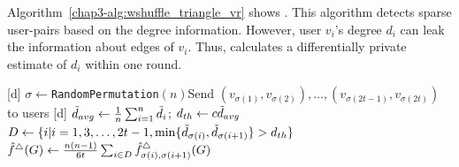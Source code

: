 Algorithm~\ref{chap3-alg:wshuffle_triangle_vr} shows \AlgWSTriVR{}.
This algorithm detects sparse user-pairs based on the degree information.
However, user $v_i$'s degree $d_i$ can leak the information about edges of $v_i$.
Thus, \AlgWSTriVR{} calculates a differentially private estimate of $d_i$ within one round.

\setlength{\algomargin}{5mm}
\begin{algorithm}[t]
  \SetAlgoLined
  [d] $\sigma \leftarrow$\texttt{RandomPermutation}$(n)$\;
  [d] Send $(v_{\sigma(1)}, v_{\sigma(2)}), \ldots, (v_{\sigma(2t-1)}, v_{\sigma(2t)})$ to users\;
  [d] $\tilde{d}_{avg} \leftarrow \frac{1}{n} \sum_{i=1}^n \tilde{d}_i$; $d_{th} \leftarrow c \tilde{d}_{avg}$\;
  [d] $D \leftarrow \{i | i = 1, 3, \ldots, 2t-1,
  \min\{\tilde{d}_{\sigma(i)}, \tilde{d}_{\sigma(i+1)}\} > d_{th}\}$\;
  [d] $\hat{f}^\triangle(G) \leftarrow \frac{n(n-1)}{6t} \sum_{i \in D} \hat{f}_{\sigma(i),\sigma(i+1)}^\triangle(G)$\;
  [d] 
  \caption[Our triangle counting algorithm with variance reduction \AlgWSTriVR{}.]{Our triangle counting algorithm with variance reduction \AlgWSTriVR{}.
  \AlgWSLE{} is shown in Algorithm~\ref{chap3-alg:WSLE}.
  }\label{chap3-alg:wshuffle_triangle_vr}
\end{algorithm}

